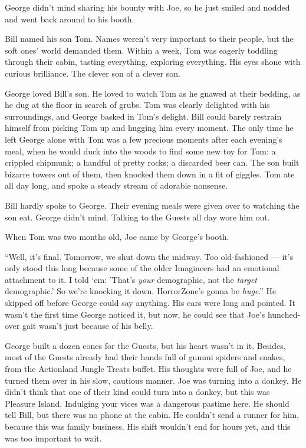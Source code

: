 George didn't mind sharing his bounty with Joe, so he just smiled
and nodded and went back around to his booth.

\tb

Bill named his son Tom. Names weren't very important to their
people, but the soft ones' world demanded them. Within a week, Tom
was eagerly toddling through their cabin, tasting everything,
exploring everything. His eyes shone with curious brilliance. The
clever son of a clever son.

George loved Bill's son. He loved to watch Tom as he gnawed at
their bedding, as he dug at the floor in search of grubs. Tom was
clearly delighted with his surroundings, and George basked in Tom's
delight. Bill could barely restrain himself from picking Tom up and
hugging him every moment. The only time he left George alone with
Tom was a few precious moments after each evening's meal, when he
would duck into the woods to find some new toy for Tom: a crippled
chipmunk; a handful of pretty rocks; a discarded beer can. The son
built bizarre towers out of them, then knocked them down in a fit
of giggles. Tom ate all day long, and spoke a steady stream of
adorable nonsense.

Bill hardly spoke to George. Their evening meals were given over to
watching the son eat. George didn't mind. Talking to the Guests all
day wore him out.

When Tom was two months old, Joe came by George's booth.

``Well, it's final. Tomorrow, we shut down the midway. Too old-fashioned --- 
it's only stood this long because some of the older Imagineers had an emotional 
attachment to it. I told `em: 'That's \emph{your} demographic, not the 
\emph{target} demographic.' So we're knocking it down. HorrorZone's gonna be 
\emph{huge}.''
He skipped off before George could say anything. His ears were long
and pointed. It wasn't the first time George noticed it, but now,
he could see that Joe's hunched-over gait wasn't just because of
his belly.

George built a dozen cones for the Guests, but his heart wasn't in
it. Besides, most of the Guests already had their hands full of
gummi spiders and snakes, from the Actionland Jungle Treats buffet.
His thoughts were full of Joe, and he turned them over in his slow,
cautious manner. Joe was turning into a donkey. He didn't think
that one of their kind could turn into a donkey, but this was
Pleasure Island. Indulging your vices was a dangerous pastime here.
He should tell Bill, but there was no phone at the cabin. He
couldn't send a runner for him, because this was family business.
His shift wouldn't end for hours yet, and this was too important to
wait.

